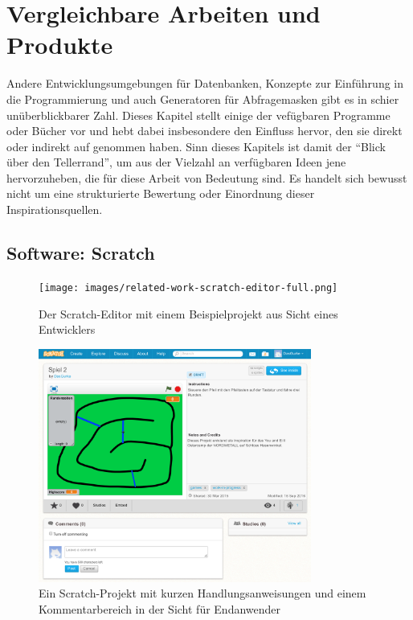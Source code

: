 \section{Vergleichbare Arbeiten und Produkte}
\label{sec:related-work}

Andere Entwicklungsumgebungen für Datenbanken, Konzepte zur Einführung in die Programmierung und auch Generatoren für Abfragemasken gibt es in schier unüberblickbarer Zahl. Dieses Kapitel stellt einige der vefügbaren Programme oder Bücher vor und hebt dabei insbesondere den Einfluss hervor, den sie direkt oder indirekt auf \idename{} genommen haben. Sinn dieses Kapitels ist damit der "`Blick über den Tellerrand"', um aus der Vielzahl an verfügbaren Ideen jene hervorzuheben, die für diese Arbeit von Bedeutung sind. Es handelt sich bewusst nicht um eine strukturierte Bewertung oder Einordnung dieser Inspirationsquellen.

\subsection{Software: Scratch}
\label{sec:related-work-scratch}

\begin{figure}[p]
  \centering \texttt{[image: images/related-work-scratch-editor-full.png]}
  \caption{Der Scratch-Editor mit einem Beispielprojekt aus Sicht eines Entwicklers}
  \label{fig:scratch-editor-full}
\end{figure}

\begin{figure}[p]
  \centering \includegraphics[width=0.8\textwidth]{images/related-work-scratch-project-full.png}
  \caption{Ein Scratch-Projekt mit kurzen Handlungsanweisungen und einem Kommentarbereich in der Sicht für Endanwender}
  \label{fig:scratch-enduser-full}
\end{figure}

